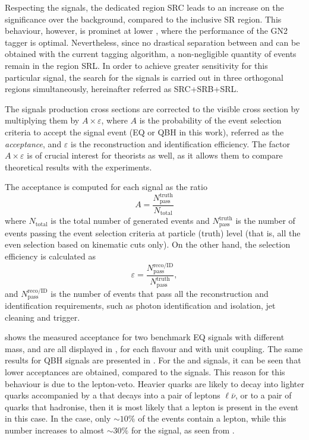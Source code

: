 Respecting the \cstar signals, the dedicated \ctagging region SRC leads to an increase on the significance over the background, compared to the inclusive SR region. This behaviour, however, is prominet at lower \mc, where the performance of the GN2 tagger is optimal.
Nevertheless, since no drastical separation between \cquarks and \lquarks can be obtained with the current tagging algorithm, a non-negligible quantity of \cstar events remain in the \ltagged region SRL. In order to achieve greater sensitivity for this particular signal, the search for the \cstar signals is carried out in three orthogonal regions simultaneously, hereinafter referred as SRC+SRB+SRL.


The signals production cross sections are corrected to the visible cross section by multiplying them by \(A \times \varepsilon\), where \(A\) is the probability of the event selection criteria to accept the signal event (\ac{EQ} or \ac{QBH} in this work), referred as the \textit{acceptance}, and \(\varepsilon\) is the reconstruction and identification efficiency. The factor \(A \times \varepsilon\) is of crucial interest for theorists as well, as it allows them to compare theoretical results with the experiments.

The acceptance is computed for each signal as the ratio
\begin{equation}
    A = \frac{N^{\text{truth}}_{\text{pass}}}{N_{\text{total}}}
\end{equation}
where \(N_{\text{total}}\) is the total number of generated events and \(N^{\text{truth}}_{\text{pass}}\) is the number of events passing the event selection criteria at particle (truth) level (that is, all the even selection based on kinematic cuts only). On the other hand, the selection efficiency is calculated as
\begin{equation}
    \varepsilon = \frac{N^{\text{reco/ID}}_{\text{pass}}}{N^{\text{truth}}_{\text{pass}}},
\end{equation}
and \(N^{\text{reco/ID}}_{\text{pass}}\) is the number of events that pass all the reconstruction and identification requirements, such as photon identification and isolation, jet cleaning and trigger. 

\Tab{\ref{tab:signals:acc_eff:acceptances}} shows the measured acceptance for two benchmark \ac{EQ} signals with different mass, and are all displayed in \Fig{\ref{fig:signals:acc_eff:acceptances:qstar}}, for each flavour and with unit coupling. The same results for \ac{QBH} signals are presented in \Fig{\ref{fig:signals:acc_eff:acceptances:qbh}}.
For the \cstar and \qstar signals, it can be seen that lower acceptances are obtained, compared to the \qstar signals. This reason for this behaviour is due to the lepton-veto. Heavier quarks are likely to decay into lighter quarks accompanied by a \Wboson that decays into a pair of leptons \(\ell \bar{\nu}\), or to a pair of quarks that hadronise, then it is most likely that a lepton is present in the event in this case. In the \qstar case, only \(\sim 10\%\) of the events contain a lepton, while this number increases to almost \(\sim 30\%\) for the \bstar signal, as seen from \Tab{\ref{tab:signals:acc_eff:acceptances}}.

